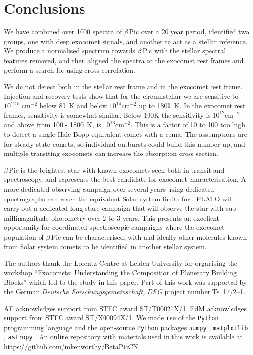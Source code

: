 \documentclass{aa}
\newcommand{\bp}{$\beta$\,Pic}
\begin{document}
\section{Conclusions}\label{sec:conclusion}

We have combined over 1000 spectra of \bp{} over a 20 year period, identified two groups, one with deep exocomet signals, and another to act as a stellar reference.
%
We produce a normalised spectrum towards \bp{} with the stellar spectral features removed, and then aligned the spectra to the exocomet rest frames and perform a search for  using cross correlation.

We do not detect  both in the stellar rest frame and in the exocomet rest frame.
%
Injection and recovery tests show that for the circumstellar  we are sensitive to $10^{12.5}$ cm$^{-2}$ below 80~K and below $10^{14}$cm$^{-2}$ up to 1800~K.
%
In the exocomet rest frames, sensitivity is somewhat similar.
%
Below 100K the sensitivity is $10^{12}$cm$^{-2}$ and above from 100 - 1800~K, is $10^{13}$cm$^{-2}$.
%
This is a factor of 10 to 100 too high to detect a single Hale-Bopp equivalent comet with a  coma.
%
The assumptions are for steady state comets, so individual outbursts could build this number up, and multiple transiting exocomets can increase the absorption cross section.

\bp{} is the brightest star with known exocomets seen both in transit and spectroscopy, and represents the best candidate for exocomet characterisation.
%
A more dedicated observing campaign over several years using dedicated spectrographs can reach the equivalent Solar system limits for .
%
PLATO will carry out a dedicated long stare campaign that will observe the star with sub-millimagnitude photometry over 2 to 3 years.
%
This presents an excellent opportunity for coordinated spectroscopic campaigns where the exocomet population of \bp{} can be characterised, with  and ideally other molecules known from Solar system comets to be identified in another stellar system.

\begin{acknowledgements}

The authors thank the Lorentz Centre at Leiden University for organising the workshop ``Exocomets: Understanding the Composition of Planetary Building Blocks'' which led to the study in this paper. 
%
Part of this work was supported by the German \emph{Deut\-sche For\-schungs\-ge\-mein\-schaft, DFG\/} project number Ts~17/2--1.

AF acknowledges support from STFC award ST/T00021X/1. EdM acknowledges support from STFC award ST/X00094X/1.
%
We made use of the {\tt Python} programming language \citep{rossum1995} and the open-source {\tt Python} packages {\tt numpy} \citep{walt2011}, {\tt matplotlib} \citep{hunter2007}, {\tt astropy} \citep{astropy2013}.
%      
An online repository with materials used in this work is available at \url{https://github.com/mkenworthy/BetaPicCN}

\end{acknowledgements}
\end{document}
